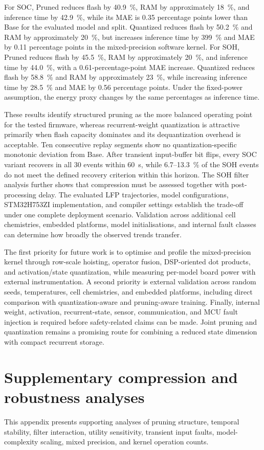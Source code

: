\documentclass[review]{elsarticle}
\begin{document}
For SOC, Pruned reduces flash by 40.9~\%, RAM by approximately 18~\%, and inference time by 42.9~\%, while its MAE is 0.35 percentage points lower than Base for the evaluated model and split. Quantized reduces flash by 50.2~\% and RAM by approximately 20~\%, but increases inference time by 399~\% and MAE by 0.11 percentage points in the mixed-precision software kernel. For SOH, Pruned reduces flash by 45.5~\%, RAM by approximately 20~\%, and inference time by 44.0~\%, with a 0.61-percentage-point MAE increase. Quantized reduces flash by 58.8~\% and RAM by approximately 23~\%, while increasing inference time by 28.5~\% and MAE by 0.56 percentage points. Under the fixed-power assumption, the energy proxy changes by the same percentages as inference time.

These results identify structured pruning as the more balanced operating point for the tested firmware, whereas recurrent-weight quantization is attractive primarily when flash capacity dominates and its dequantization overhead is acceptable. Ten consecutive replay segments show no quantization-specific monotonic deviation from Base. After transient input-buffer bit flips, every SOC variant recovers in all 30 events within 60~s, while 6.7--13.3~\% of the SOH events do not meet the defined recovery criterion within this horizon. The SOH filter analysis further shows that compression must be assessed together with post-processing delay. The evaluated LFP trajectories, model configurations, STM32H753ZI implementation, and compiler settings establish the trade-off under one complete deployment scenario. Validation across additional cell chemistries, embedded platforms, model initialisations, and internal fault classes can determine how broadly the observed trends transfer.

The first priority for future work is to optimise and profile the mixed-precision kernel through row-scale hoisting, operator fusion, DSP-oriented dot products, and activation/state quantization, while measuring per-model board power with external instrumentation. A second priority is external validation across random seeds, temperatures, cell chemistries, and embedded platforms, including direct comparison with quantization-aware and pruning-aware training. Finally, internal weight, activation, recurrent-state, sensor, communication, and MCU fault injection is required before safety-related claims can be made. Joint pruning and quantization remains a promising route for combining a reduced state dimension with compact recurrent storage.
\appendix
\section{Supplementary compression and robustness analyses}\label{app:supplementary}
This appendix presents supporting analyses of pruning structure, temporal stability, filter interaction, utility sensitivity, transient input faults, model-complexity scaling, mixed precision, and kernel operation counts.
\end{document}
